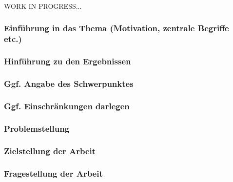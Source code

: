 WORK IN PROGRESS...

\subsubsection*{Einführung in das Thema (Motivation, zentrale Begriffe etc.)}
\subsubsection*{Hinführung zu den Ergebnissen}
\subsubsection*{Ggf. Angabe des Schwerpunktes}
\subsubsection*{Ggf. Einschränkungen darlegen}
\subsubsection*{Problemstellung}
\subsubsection*{Zielstellung der Arbeit}
\subsubsection*{Fragestellung der Arbeit}

